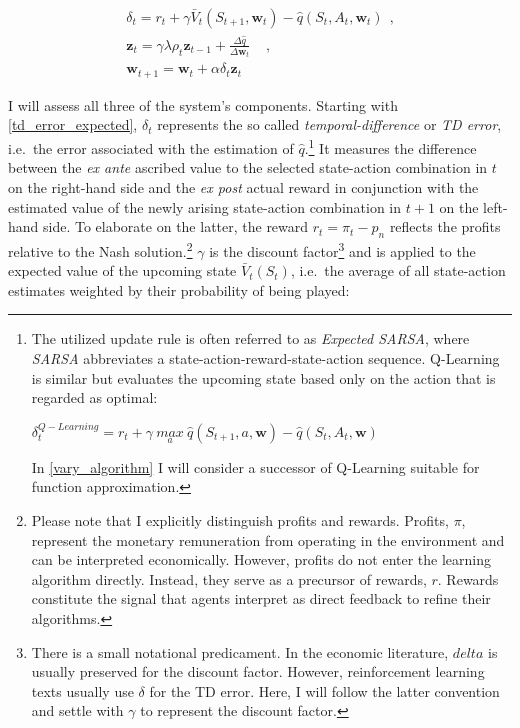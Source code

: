 \begin{gather}
\delta_t = r_t + \gamma \bar{V}_t(S_{t+1}, \boldsymbol{w}_t) - \hat{q}(S_t, A_t, \boldsymbol{w}_t) ~~ \text{,} \label{td_error_expected} \\
\boldsymbol{z}_{t} = 
\gamma \lambda \rho_t \boldsymbol{z}_{t-1} + \frac{\Delta \hat{q}}{\Delta \boldsymbol{w}_t} ~~~~~ \text{,} \label{eligibility_trace_update} \\
\boldsymbol{w}_{t+1} = \boldsymbol{w}_t + \alpha \delta_t	\boldsymbol{z}_t \label{update_rule}
\end{gather}

I will assess all three of the system's components. Starting with \autoref{td_error_expected}, $\delta_t$ represents the so called \emph{temporal-difference} or \emph{TD error}, i.e.\ the error associated with the estimation of $\hat{q}$.\footnote{The utilized update rule is often referred to as \emph{Expected SARSA}, where \emph{SARSA} abbreviates a state-action-reward-state-action sequence. Q-Learning is similar but evaluates the upcoming state based only on the action that is regarded as optimal:
	\begin{center}
		$\delta_t^{Q-Learning} = r_t + \gamma ~ \underset{a}{max} ~ \hat{q}(S_{t+1}, a, \boldsymbol{w}) - \hat{q}(S_t, A_t, \boldsymbol{w})$
	\end{center}
	In \autoref{vary_algorithm} I will consider a successor of Q-Learning suitable for function approximation.} It measures the difference between the \emph{ex ante} ascribed value to the selected state-action combination in $t$ on the right-hand side and the \emph{ex post} actual reward in conjunction with the estimated value of the newly arising state-action combination in $t+1$ on the left-hand side. To elaborate on the latter, the reward $r_t = \pi_t - p_n$ reflects the profits relative to the Nash solution.\footnote{Please note that I explicitly distinguish profits and rewards. Profits, $\pi$, represent the monetary remuneration from operating in the environment and can be interpreted economically. However, profits do not enter the learning algorithm directly. Instead, they serve as a precursor of rewards, $r$. Rewards constitute the signal that agents interpret as direct feedback to refine their algorithms.} $\gamma$ is the discount factor\footnote{There is a small notational predicament. In the economic literature, $delta$ is usually preserved for the discount factor. However, reinforcement learning texts usually use $\delta$ for the TD error. Here, I will follow the latter convention and settle with $\gamma$ to represent the discount factor.} and is applied to the expected value of the upcoming state $\bar{V}_t(S_t)$, i.e.\ the average of all state-action estimates weighted by their probability of being played:

